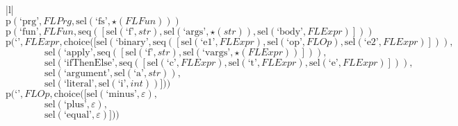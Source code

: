 \footnotesize\begin{center}\begin{tabular}{|l|}\hline
{}
\\\hline
$\mathrm{p}(\text{`prg'},\mathit{FLPrg},\mathrm{sel}\left(\text{`fs'},\star \left(\mathit{FLFun}\right)\right))$	\\
$\mathrm{p}(\text{`fun'},\mathit{FLFun},\mathrm{seq}\left(\left[\mathrm{sel}\left(\text{`f'},str\right), \mathrm{sel}\left(\text{`args'},\star \left(str\right)\right), \mathrm{sel}\left(\text{`body'},\mathit{FLExpr}\right)\right]\right))$	\\
$\mathrm{p}(\text{`'},\mathit{FLExpr},\mathrm{choice}([\mathrm{sel}\left(\text{`binary'},\mathrm{seq}\left(\left[\mathrm{sel}\left(\text{`e1'},\mathit{FLExpr}\right), \mathrm{sel}\left(\text{`op'},\mathit{FLOp}\right), \mathrm{sel}\left(\text{`e2'},\mathit{FLExpr}\right)\right]\right)\right),$\\$\qquad\qquad\mathrm{sel}\left(\text{`apply'},\mathrm{seq}\left(\left[\mathrm{sel}\left(\text{`f'},str\right), \mathrm{sel}\left(\text{`vargs'},\star \left(\mathit{FLExpr}\right)\right)\right]\right)\right),$\\$\qquad\qquad\mathrm{sel}\left(\text{`ifThenElse'},\mathrm{seq}\left(\left[\mathrm{sel}\left(\text{`c'},\mathit{FLExpr}\right), \mathrm{sel}\left(\text{`t'},\mathit{FLExpr}\right), \mathrm{sel}\left(\text{`e'},\mathit{FLExpr}\right)\right]\right)\right),$\\$\qquad\qquad\mathrm{sel}\left(\text{`argument'},\mathrm{sel}\left(\text{`a'},str\right)\right),$\\$\qquad\qquad\mathrm{sel}\left(\text{`literal'},\mathrm{sel}\left(\text{`i'},int\right)\right)]))$	\\
$\mathrm{p}(\text{`'},\mathit{FLOp},\mathrm{choice}([\mathrm{sel}\left(\text{`minus'},\varepsilon\right),$\\$\qquad\qquad\mathrm{sel}\left(\text{`plus'},\varepsilon\right),$\\$\qquad\qquad\mathrm{sel}\left(\text{`equal'},\varepsilon\right)]))$	\\
\hline\end{tabular}\end{center}



